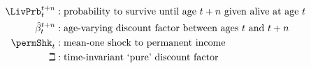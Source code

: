   \begin{equation*}\begin{gathered}\begin{aligned}
        \LivPrb _{t}^{t+n} &:\text{probability to survive until age $t+n$ given alive at age $t$}
        \\      \hat{\beta}_{t}^{t+n} &:\text{age-varying discount factor between ages $t$ and $t+n$}
        \\     \permShk_{t} &:\text{mean-one shock to permanent income}
        \\     \beth &:\text{time-invariant `pure' discount factor}
      \end{aligned}\end{gathered}\end{equation*}
